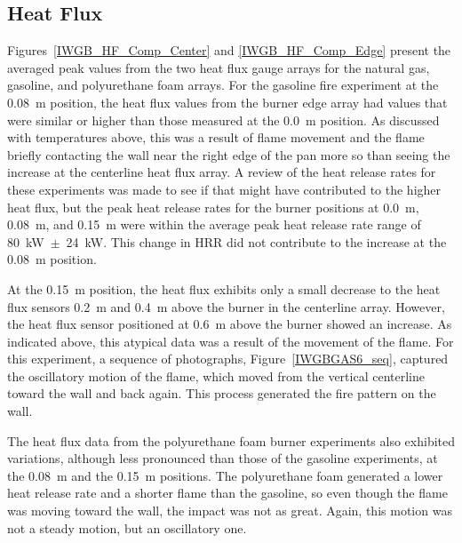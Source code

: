 \documentclass[twoside]{uocthesis}
\begin{document}
{\subsection{Heat Flux}

Figures~\ref{IWGB_HF_Comp_Center} and \ref{IWGB_HF_Comp_Edge} present the averaged peak values from the two heat flux gauge arrays for the natural gas, gasoline, and polyurethane foam arrays.  For the gasoline fire experiment at the 0.08~m position, the heat flux values from the burner edge array had values that were similar or higher than those measured at the 0.0~m position. As discussed with temperatures above, this was a result of flame movement and the flame briefly contacting the wall near the right edge of the pan more so than seeing the increase at the centerline heat flux array.  A review of the heat release rates for these experiments was made to see if that might have contributed to the higher heat flux, but the peak heat release rates for the burner positions at 0.0~m, 0.08~m, and 0.15~m were within the average peak heat release rate range of 80~kW~$\pm$~24~kW.  This change in HRR did not contribute to the increase at the 0.08~m position.  

At the 0.15~m position, the heat flux exhibits only a small decrease to the heat flux sensors 0.2~m and 0.4~m above the burner in the centerline array.  However, the heat flux sensor positioned at 0.6~m above the burner showed an increase.  As indicated above, this atypical data was a result of the movement of the flame.  For this experiment, a sequence of photographs, Figure~\ref{IWGBGAS6_seq}, captured the oscillatory motion of the flame, which moved from the vertical centerline toward the wall and back again.  This process generated the fire pattern on the wall.    

The heat flux data from the polyurethane foam burner experiments also exhibited variations, although less pronounced than those of the gasoline experiments, at the 0.08~m and the 0.15~m positions.  The polyurethane foam generated a lower heat release rate and a shorter flame than the gasoline, so even though the flame was moving toward the wall, the impact was not as great.  Again, this motion was not a steady motion, but an oscillatory one.      

}
\end{document}
